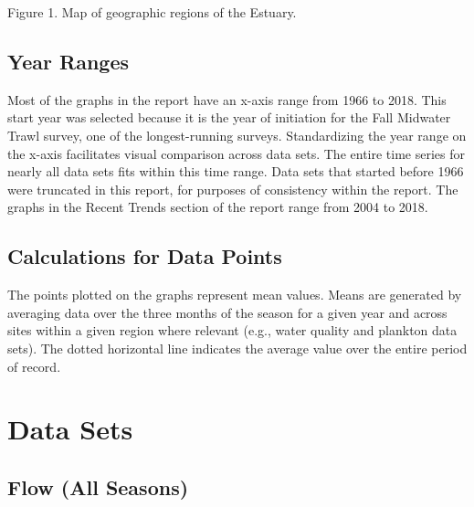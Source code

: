 \documentclass[
]{book}
\begin{document}
Figure 1. Map of geographic regions of the Estuary.

\hypertarget{year-ranges}{%
\subsection{Year Ranges}\label{year-ranges}}

Most of the graphs in the report have an x-axis range from 1966 to 2018. This start year was selected because it is the year of initiation for the Fall Midwater Trawl survey, one of the longest-running surveys. Standardizing the year range on the x-axis facilitates visual comparison across data sets. The entire time series for nearly all data sets fits within this time range. Data sets that started before 1966 were truncated in this report, for purposes of consistency within the report. The graphs in the Recent Trends section of the report range from 2004 to 2018.

\hypertarget{calculations-for-data-points}{%
\subsection{Calculations for Data Points}\label{calculations-for-data-points}}

The points plotted on the graphs represent mean values. Means are generated by averaging data over the three months of the season for a given year and across sites within a given region where relevant (e.g., water quality and plankton data sets). The dotted horizontal line indicates the average value over the entire period of record.

\hypertarget{data-sets}{%
\section{Data Sets}\label{data-sets}}

\hypertarget{flow-all-seasons}{%
\subsection{Flow (All Seasons)}\label{flow-all-seasons}}
\end{document}
